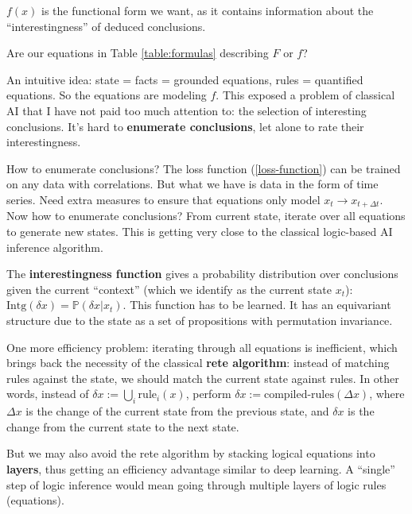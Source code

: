 $f(x)$ is the functional form we want, as it contains information about the ``interestingness'' of deduced conclusions.

Are our equations in Table \ref{table:formulas} describing $F$ or $f$?  

An intuitive idea:  state = facts = grounded equations, rules = quantified equations.  So the equations are modeling $f$.  This exposed a problem of classical AI that I have not paid too much attention to:  the selection of interesting conclusions.  It's hard to \textbf{enumerate conclusions}, let alone to rate their interestingness.

How to enumerate conclusions?  The loss function (\ref{loss-function}) can be trained on any data with correlations.  But what we have is data in the form of time series.  Need extra measures to ensure that equations only model $x_t \rightarrow x_{t+\Delta t}$.  Now how to enumerate conclusions?  From current state, iterate over all equations to generate new states.  This is getting very close to the classical logic-based AI inference algorithm.

The \textbf{interestingness function} gives a probability distribution over conclusions given the current ``context'' (which we identify as the current state $x_t$): $ \mathrm{Intg}(\delta x) = \mathbb{P}(\delta x | x_t) $.  This function has to be learned.  It has an equivariant structure due to the state as a set of propositions with permutation invariance.

One more efficiency problem:  iterating through all equations is inefficient, which brings back the necessity of the classical \textbf{rete algorithm}:  instead of matching rules against the state, we should match the current state against rules.  In other words, instead of $\delta x := \bigcup_i \mathrm{rule}_i (x)$, perform $\delta x := \text{compiled-rules}(\Delta x) $, where $\Delta x$ is the change of the current state from the previous state, and $\delta x$ is the change from the current state to the next state.

But we may also avoid the rete algorithm by stacking logical equations into \textbf{layers}, thus getting an efficiency advantage similar to deep learning.  A ``single'' step of logic inference would mean going through multiple layers of logic rules (equations).  
